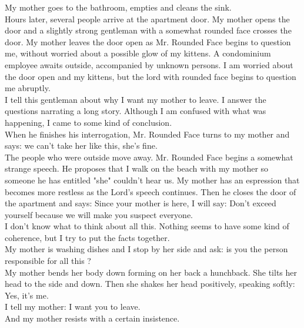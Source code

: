 \documentclass[11pt]{book}
\begin{document}
\noindent My mother goes to the bathroom, empties and cleans the sink. \\

\noindent Hours later, several people arrive at the apartment door. My mother opens the door and a slightly strong gentleman with a somewhat rounded face crosses the door. My mother leaves the door open as Mr. Rounded Face begins to question me, without worried about a possible glow of my kittens. A condominium employee awaits outside, accompanied by unknown persons. I am worried about the door open and my kittens, but the lord with rounded face begins to question me abruptly. \\

\noindent I tell this gentleman about why I want my mother to leave. I answer the questions narrating a long story. Although I am confused with what was happening, I came to some kind of conclusion. \\

\noindent When he finishes his interrogation, Mr. Rounded Face turns to my mother and says: we can't take her like this, she's fine. \\

\noindent The people who were outside move away. Mr. Rounded Face begins a somewhat strange speech. He proposes that I walk on the beach with my mother so someone he has entitled "she" couldn't hear us. My mother has an espression that becomes more restless as the Lord's speech continues. Then he closes the door of the apartment and says: Since your mother is here, I will say: Don't exceed yourself because we will make you suspect everyone.  \\

\noindent I don't know what to think about all this. Nothing seems to have some kind of coherence, but I try to put the facts together. \\

\noindent My mother is washing dishes and I stop by her side and ask: is you the person responsible for all this ? \\

\noindent My mother bends her body down forming on her back a hunchback. She tilts her head to the side and down. Then she shakes her head positively, speaking softly: Yes, it's me. \\

\noindent I tell my mother: I want you to leave. \\

\noindent And my mother resists with a certain insistence. \\
\end{document}
